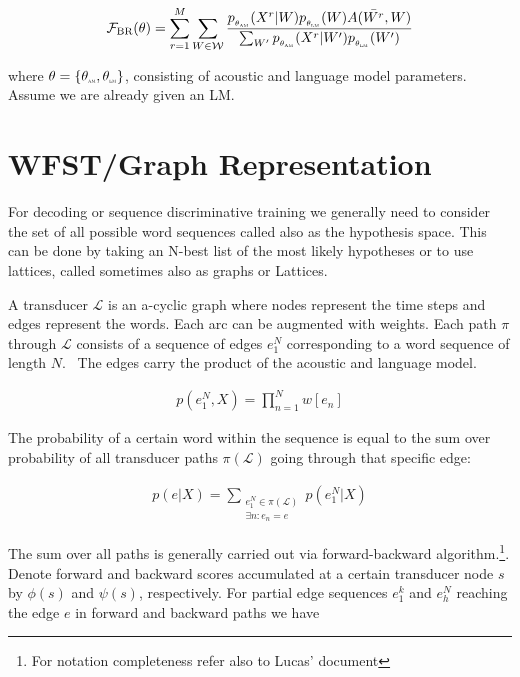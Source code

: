 \documentclass[a4paper,13.5pt]{extarticle}
\begin{document}
	\begin{align}
		\label{BayesRisk3}
		\mathcal{F_{\text{BR}}}(\theta) = \sum_{r=1}^M\sum_{W \in \mathcal{W}} \frac{p_{_{\theta_{\scaleto{\text{AM}}{2pt}}}}(X^r | W)p_{_{\theta_{\scaleto{\text{LM}}{2pt}}}}(W)  A(\bar{W^r}, W)}{\sum_{W^{\prime}} p_{_{\theta_{\scaleto{\text{AM}}{2pt}}}}(X^r | W^{\prime})p_{_{\theta_{\scaleto{\text{LM}}{2pt}}}}(W^{\prime})}
	\end{align}
	
	where $\theta=\{\theta_{\scaleto{\text{AM}}{2pt}}, \theta_{\scaleto{\text{LM}}{2pt}}\}$, consisting of acoustic and language model parameters. Assume we are already given an LM. 
	
	\section{WFST/Graph Representation}
	
	For decoding or sequence discriminative training we generally need to consider the set of all possible word sequences called also as the hypothesis space. This can be done by taking an N-best list of the most likely hypotheses or to use lattices, called sometimes also as graphs or Lattices.
	
	A transducer $\mathcal{L}$ is an a-cyclic graph where nodes represent the time steps and edges represent the words. Each arc can be augmented with weights. Each path $\pi$ through $\mathcal{L}$  consists of a sequence of edges $e_1^N$ corresponding to a word sequence of length $N$. \ The edges carry the product of the acoustic and language model.
	
	\begin{align}
		\label{probpath}
		p(e_1^N, X) = \prod_{n=1}^N w[e_n]
	\end{align}
	
	The probability of a certain word within the sequence is equal to the sum over probability of all transducer paths $\pi(\mathcal{L})$ going through that specific edge:
	
	\begin{align}
		\label{probedge}
		p(e | X) = \sum_{\substack{e_1^N \in \pi(\mathcal{L})\\ \exists n: e_n=e}}p(e_1^N | X)
	\end{align}
	
	The sum over all paths is generally carried out via forward-backward algorithm.\footnote{For notation completeness refer also to Lucas' document}. Denote forward and backward scores accumulated at a certain transducer node $s$ by $\phi(s)$ and $\psi(s)$, respectively. For partial edge sequences $e_1^k$ and  $e_h^N$ reaching the edge $e$ in forward and backward paths we have
	
\end{document}
